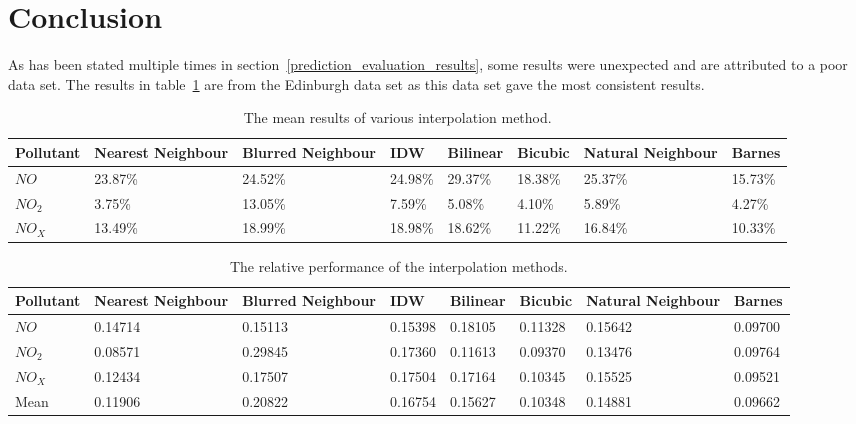 	\section{Conclusion}


		As has been stated multiple times in section~\ref{prediction_evaluation_results}, some results were unexpected and are attributed to a poor data set. The results in table~\ref{tab:all_results} are from the Edinburgh data set as this data set gave the most consistent results. 

		\begin{table}
			\centering
    		\begin{tabularx}{\linewidth}{|X|X|X|X|X|X|X|X|}
    			\hline
				Pollutant & Nearest Neighbour & Blurred Neighbour & IDW & Bilinear & Bicubic & Natural Neighbour & Barnes \\ \hline
				$NO$ & 23.87\% & 24.52\% & 24.98\% & 29.37\% & 18.38\% & 25.37\% & 15.73\% \\
				$NO_{2}$ & 3.75\% & 13.05\% & 7.59\% & 5.08\% & 4.10\% & 5.89\% & 4.27\% \\
				$NO_{X}$ & 13.49\% & 18.99\% & 18.98\% & 18.62\% & 11.22\% & 16.84\% & 10.33\% \\
				\hline
			\end{tabularx}
			\caption{The mean results of various interpolation method.}
			\label{tab:all_results}
		\end{table}

		

		\begin{table}
			\centering
    		\begin{tabularx}{\linewidth}{|X|X|X|X|X|X|X|X|}
    			\hline
				Pollutant & Nearest Neighbour & Blurred Neighbour & IDW & Bilinear & Bicubic & Natural Neighbour & Barnes \\ \hline
				$NO$ & 0.14714 & 0.15113 & 0.15398 & 0.18105 & 0.11328 & 0.15642 & 0.09700 \\
				$NO_{2}$ & 0.08571 & 0.29845 & 0.17360 & 0.11613 & 0.09370 & 0.13476 & 0.09764\\
				$NO_{X}$ & 0.12434 & 0.17507 & 0.17504 & 0.17164 & 0.10345 & 0.15525 & 0.09521 \\ \hline
				Mean & 0.11906 & 0.20822 & 0.16754 & 0.15627 & 0.10348 & 0.14881 & 0.09662 \\
				\hline
			\end{tabularx}
			\caption{The relative performance of the interpolation methods.}
			\label{tab:all_ratio_results}
		\end{table}

